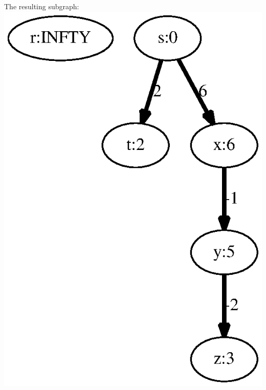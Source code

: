 \documentclass{article}
\begin{document}
\begin{minipage}[b][.25\textheight]{0.18181818181818182\linewidth}
The resulting subgraph: 
\includegraphics[height=.25\textheight]{dag_shortest_path_07.eps}
\end{minipage}
\end{document}
